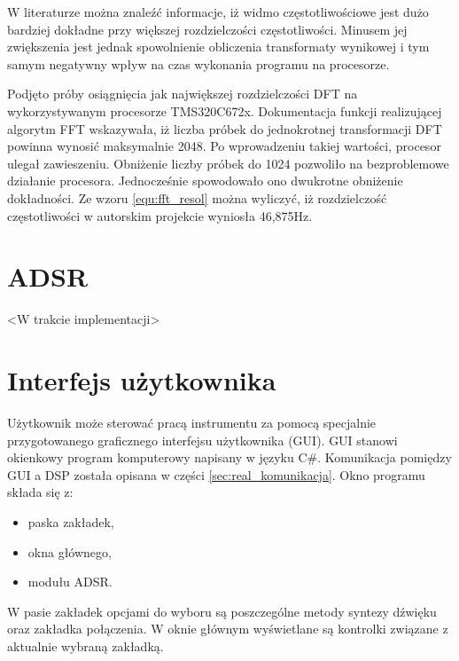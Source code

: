 W literaturze można znaleźć informacje, iż widmo częstotliwościowe jest dużo bardziej dokładne przy większej rozdzielczości częstotliwości. Minusem jej zwiększenia jest jednak spowolnienie obliczenia transformaty wynikowej i tym samym negatywny wpływ na czas wykonania programu na procesorze.

Podjęto próby osiągnięcia jak największej rozdzielczości DFT na wykorzystywanym procesorze TMS320C672x. Dokumentacja funkcji realizującej algorytm FFT wskazywała, iż liczba próbek do jednokrotnej transformacji DFT powinna wynosić maksymalnie 2048. Po wprowadzeniu takiej wartości, procesor ulegał zawieszeniu. Obniżenie liczby próbek do 1024 pozwoliło na bezproblemowe działanie procesora. Jednocześnie spowodowało ono dwukrotne obniżenie dokładności. Ze wzoru \ref{equ:fft_resol} można wyliczyć, iż rozdzielczość częstotliwości w autorskim projekcie wyniosła 46,875Hz.


\section{ADSR}\label{sec:real_adsr}
<W trakcie implementacji>


\section{Interfejs użytkownika}
Użytkownik może sterować pracą instrumentu za pomocą specjalnie przygotowanego graficznego interfejsu użytkownika (GUI). GUI stanowi okienkowy program komputerowy napisany w języku C\#. Komunikacja pomiędzy GUI a DSP została opisana w części \ref{sec:real_komunikacja}. Okno programu składa się z:
\begin{itemize}
	\item paska zakładek,
	\item okna głównego,
	\item modułu ADSR.
\end{itemize}
W pasie zakładek opcjami do wyboru są poszczególne metody syntezy dźwięku oraz zakładka połączenia.
W oknie głównym wyświetlane są kontrolki związane z aktualnie wybraną zakładką. 

